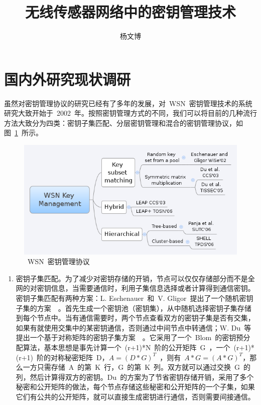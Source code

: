 \documentclass[a4paper,10pt]{article}
\title{无线传感器网络中的密钥管理技术}
\author{杨文博}
\begin{document}
\maketitle

\section{国内外研究现状调研}

虽然对密钥管理协议的研究已经有了多年的发展，对~WSN~密钥管理技术的系统研究大致开始于~2002~年。按照密钥管理方式的不同，我们可以将目前的几种流行方法大致分为四类：密钥子集匹配、分层密钥管理和混合的密钥管理协议，如图~\ref{wsn_keyman_1}~所示。

\begin{figure}[htbp]
  \centering
  \includegraphics[width=.9\textwidth,keepaspectratio]{wsn_keyman_1}
  \caption{\label{wsn_keyman_1}~WSN~密钥管理协议}
\end{figure}

\begin{enumerate}

\item 密钥子集匹配。为了减少对密钥存储的开销，节点可以仅仅存储部分而不是全网的对密钥信息，当需要通信时，利用子集信息选择或者计算得到通信密钥。密钥子集匹配有两种方案：L. Eschenauer~和~V. Gligor~提出了一个随机密钥子集的方案~\cite{Eschenauer2002}~。首先生成一个密钥池（密钥集），从中随机选择密钥子集存储到每个节点中。当有通信需要时，两个节点查看双方的密钥子集是否有交集，如果有就使用交集中的某密钥通信，否则通过中间节点中转通信；W. Du~等提出一个基于对称矩阵的密钥子集方案~\cite{Du2003, Du2005}~。它采用了一个~Blom~的密钥预分配算法，基本思想是事先计算一个~(r+1)*N~阶的公开矩阵~G~，一个~(r+1)*(r+1)~阶的对称秘密矩阵~D，$A=(D*G)^T$~，则有~$A*G=(A*G)^T$，那么一方只需存储~A~的第~K~行，G~的第~K~列。双方就可以通过交换~G~的列，然后计算得双方的密钥。Du~的方案为了节省密钥存储开销，采用了多个秘密和公开矩阵的做法，每个节点存储这些秘密和公开矩阵的一个子集，如果它们有公共的公开矩阵，就可以直接生成密钥进行通信，否则需要间接通信。

\end{enumerate}




\end{document}
